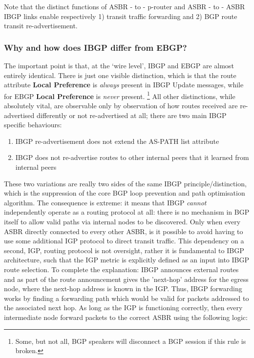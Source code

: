 
Note that the distinct functions of ASBR - to - p-router and ASBR - to - ASBR IBGP links enable respectively 1) transit traffic forwarding and 2) BGP route transit re-advertisement.

\subsubsection{Why and how does IBGP differ from EBGP?}
The important point is that, at the `wire level', IBGP and EBGP are almost
entirely identical.
There is just one visible distinction, which is that the route attribute \textbf{Local Preference} is \emph{always} present in IBGP Update messages, while for EBGP
\textbf{Local Preference} is \emph{never} present.
\footnote{Some, but not all, BGP speakers will disconnect a BGP session if this rule is broken.}
All other distinctions, while
absolutely vital, are observable only by observation of how routes received are
re-advertised differently or not re-advertised at all; there are two main IBGP
specific behaviours:
\begin{enumerate}
    \item IBGP re-advertisement does not extend the AS-PATH list attribute
    \item IBGP does not re-advertise routes to other internal peers that it learned from internal peers
\end{enumerate}


These two variations are really two sides of the same IBGP
principle/distinction, which is the suppression of the core BGP loop prevention
and path optimisation algorithm.  The consequence is extreme: it means that
IBGP \textit{cannot} independently operate as a routing protocol at all: there is no
mechanism in BGP itself to allow valid paths via internal nodes to be discovered.   Only when
every ASBR directly connected to every other ASBR, is it possible to avoid
having to use some additional IGP protocol to direct transit traffic.
This dependency on a second, IGP, routing protocol is not oversight, rather it
is fundamental to IBGP architecture, such that the IGP metric is explicitly
defined as an input into IBGP route selection.	To complete the explanation:
IBGP announces external routes and as part of the route announcement gives the
'next-hop' address for the egress node, where the next-hop address is known in
the IGP.  Thus, IBGP forwarding works by finding a forwarding path which would
be valid for packets addressed to the associated next hop.	As long as the IGP is
functioning correctly, then every intermediate node forward packets to the
correct ASBR using the following logic:

